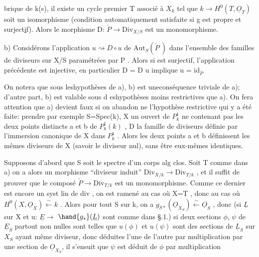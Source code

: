 brique de k(s), il existe un cycle premier T associé à $X_k$ tel que
$k \to H^0(T,\underline{O}_T)$ soit un isomorphisme (condition automatiquement satisfaite
si g est propre et surject\uline{i}f). Alors le morphisme D: $\check{P} \longrightarrow \mathrm{Div}_{X/S}$ est
un monomorphisme.

b)  Considérons l'application $u \rightsquigarrow D\circ u$ de
$\mathrm{Aut}_S(\check{P}\ )$ dans l'ensemble des familles de diviseurs sur X/S paramétrées
par P . Alors si  est surjectif, l'application précédente est injective,
en particulier D = D u implique u = $\mathrm{id}_{\check{P}}$

On notera que sous leshypothèses de a), b) est uneconséquence
triviale de a); d'autre part, b) est valable sous d eshypothèses moins
restrictives que a). On fera attention que a) devient faux si on abandon
ne l'hypothèse restrictive qui y a  été faite: prendre par exemple
S=Spec(k), X un ouvert de $P^1_k$ ne contenant pas les deux points distincts
a et b de $P^1_k(k)$ , D la famille de diviseurs définie par l'immersion
canonique de X dans $P^1_k$ . Alors les deux  points a et b
définissent les mêmes diviseurs de X (savoir le diviseur nul), sans être
eux-mêmes identiques.

Supposons d'abord que S soit le spectre d'un corps  alg clos. 
Soit T comme dans a) on a alors un morphisme ``diviseur induit''
$\mathrm{Div}_{X/k} \longrightarrow \mathrm{Div}_{T/k}$ , et il suffit de prouver que le composé $\check{P} \longrightarrow \mathrm{Div}_{T/k}$
est un monomorphisme. Comme ce dernier est encore un syst lin de div ,
on est ramené au cas où X=T , donc au cas où $H^0(X,\underline{O}_X) \xleftarrow{\sim} k$ . Alors pour
tout S sur k, on a $g_{S*}(\underline{O}_{X_S}) \xleftarrow{\sim} \underline{O}_S$ , donc (si $\underline{L}$ sur X et u: $\underline{E} \to$ $\hand{g_*}(\underline{L})$
sont comme dans §.1.) si deux sections $\phi$, $\psi$ de $\underline{E}_S$ partout non nulles
sont telles que $u(\phi)$ et $u(\psi)$ sont des sections de $\underline{L}_S$ sur $X_S$ ayant même
diviseur, donc  déduites l'une de l'autre par multiplication par
une section  de $\underline{O}_{X_S}$, il s'ensuit que $\psi$ est déduit de $\phi$ par multiplication


